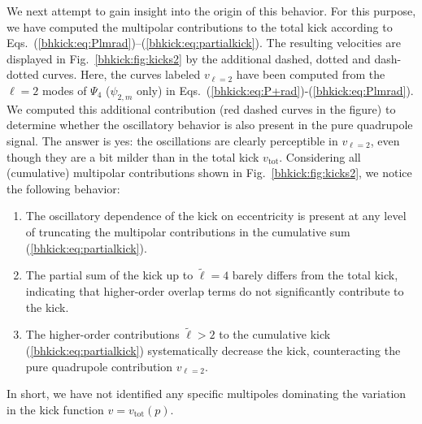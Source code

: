 We next attempt to gain insight into the origin of this
behavior. For this purpose, we have computed the
multipolar contributions to the total kick according to
Eqs.~(\ref{bhkick:eq:Plmrad})--(\ref{bhkick:eq:partialkick}). The resulting
velocities are displayed in Fig.~\ref{bhkick:fig:kicks2} by the additional
dashed, dotted and dash-dotted curves. 
Here, the curves labeled
$v_{\ell=2}$ have been computed from the $\ell=2$ modes of $\Psi_4$
($\psi_{2,m}$ only) in Eqs.~(\ref{bhkick:eq:P+rad})-(\ref{bhkick:eq:Plmrad}).
We computed this additional contribution (red dashed curves in the
figure) to determine whether the oscillatory behavior is also present
in the pure quadrupole signal. The answer is yes: the oscillations are
clearly perceptible in $v_{\ell=2}$, even though they are a bit milder
than in the total kick $v_{\mathrm{tot}}$. Considering all
(cumulative) multipolar contributions shown in Fig.~\ref{bhkick:fig:kicks2},
we notice the following behavior:
%
\begin{enumerate}
 \item The oscillatory dependence of the kick on eccentricity
       is present at any level of truncating the multipolar
       contributions in the cumulative sum (\ref{bhkick:eq:partialkick}).
 \item The partial sum of the kick up to $\tilde{\ell}=4$
       barely differs from the total kick, indicating that
       higher-order overlap terms do not significantly
       contribute to the kick.
 \item The higher-order contributions $\tilde{\ell}>2$
       to the cumulative kick (\ref{bhkick:eq:partialkick})
       systematically decrease the kick, counteracting
       the pure quadrupole contribution $v_{\ell=2}$.
\end{enumerate}
%
In short, we have not identified any specific multipoles
dominating the variation in the kick function $v=v_{\mathrm{tot}}(p)$.


